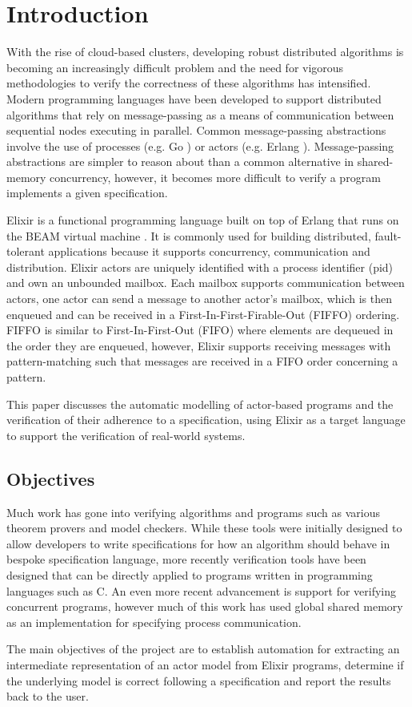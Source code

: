 \chapter{Introduction}
With the rise of cloud-based clusters, developing robust distributed algorithms is becoming an increasingly difficult problem and the need for vigorous methodologies to verify the correctness of these algorithms has intensified. Modern programming languages have been developed to support distributed algorithms that rely on message-passing as a means of communication between sequential nodes executing in parallel. Common message-passing abstractions involve the use of processes (e.g. Go \cite{go}) or actors \cite{actor} (e.g. Erlang \cite{erlang}). Message-passing abstractions are simpler to reason about than a common alternative in shared-memory concurrency, however, it becomes more difficult to verify a program implements a given specification.
\par
Elixir \cite{elixir} is a functional programming language built on top of Erlang that runs on the BEAM virtual machine \cite{beam}. It is commonly used for building distributed, fault-tolerant applications because it supports concurrency, communication and distribution. Elixir actors are uniquely identified with a process identifier (pid) and own an unbounded mailbox. Each mailbox supports communication between actors, one actor can send a message to another actor's mailbox, which is then enqueued and can be received in a First-In-First-Firable-Out (FIFFO) ordering. FIFFO is similar to First-In-First-Out (FIFO) where elements are dequeued in the order they are enqueued, however, Elixir supports receiving messages with pattern-matching such that messages are received in a FIFO order concerning a pattern.
\par
This paper discusses the automatic modelling of actor-based programs and the verification of their adherence to a specification, using Elixir as a target language to support the verification of real-world systems.
\section{Objectives}
Much work has gone into verifying algorithms and programs such as various theorem provers and model checkers. While these tools were initially designed to allow developers to write specifications for how an algorithm should behave in bespoke specification language, more recently verification tools have been designed that can be directly applied to programs written in programming languages such as C. An even more recent advancement is support for verifying concurrent programs, however much of this work has used global shared memory as an implementation for specifying process communication.
\par
The main objectives of the project are to establish automation for extracting an intermediate representation of an actor model from Elixir programs, determine if the underlying model is correct following a specification and report the results back to the user. 